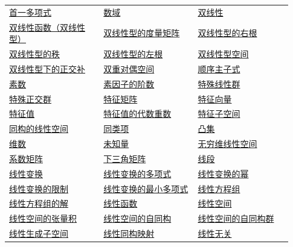 \begin{longtable}{@{}>{\raggedright\arraybackslash}p{0.31\linewidth}>{\raggedright\arraybackslash}p{0.31\linewidth}>{\raggedright\arraybackslash}p{0.31\linewidth}@{}}
\hyperref[p1:concept:c1-l558]{首一多项式} & \hyperref[p1:concept:c1-l518]{数域} & \hyperref[p1:concept:c6-l6]{双线性}\\
\hyperref[p1:concept:c7-l335]{双线性函数（双线性型）} & \hyperref[p1:concept:c7-l411]{双线性型的度量矩阵} & \hyperref[p1:concept:c7-l392]{双线性型的右根}\\
\hyperref[p1:concept:c7-l485]{双线性型的秩} & \hyperref[p1:concept:c7-l392]{双线性型的左根} & \hyperref[p1:concept:c7-l335]{双线性型空间}\\
\hyperref[p1:concept:c7-l2876]{双线性型下的正交补} & \hyperref[p1:concept:c7-l250]{双重对偶空间} & \hyperref[p1:concept:c7-l1848]{顺序主子式}\\
\hyperref[p1:concept:c1-l98]{素数} & \hyperref[p1:concept:c1-l498]{素因子的阶数} & \hyperref[p1:concept:c3-l2291]{特殊线性群}\\
\hyperref[p1:concept:c6-l1156]{特殊正交群} & \hyperref[p1:concept:c5-l1709]{特征矩阵} & \hyperref[p1:concept:c5-l171]{特征向量}\\
\hyperref[p1:concept:c5-l171]{特征值} & \hyperref[p1:concept:c5-l495]{特征值的代数重数} & \hyperref[p1:concept:c5-l171]{特征子空间}\\
\hyperref[p1:concept:c4-l2065]{同构的线性空间} & \hyperref[p1:concept:c1-l1278]{同类项} & \hyperref[p1:concept:c4-l3141]{凸集}\\
\hyperref[p1:concept:c4-l375]{维数} & \hyperref[p1:concept:c2-l7]{未知量} & \hyperref[p1:concept:c4-l375]{无穷维线性空间}\\
\hyperref[p1:concept:c2-l705]{系数矩阵} & \hyperref[p1:concept:c3-l881]{下三角矩阵} & \hyperref[p1:concept:c4-l3135]{线段}\\
\hyperref[p1:concept:c4-l1349]{线性变换} & \hyperref[p1:concept:c3-l363]{线性变换的多项式} & \hyperref[p1:concept:c3-l363]{线性变换的幂}\\
\hyperref[p1:concept:c5-l8]{线性变换的限制} & \hyperref[p1:concept:c4-l2846]{线性变换的最小多项式} & \hyperref[p1:concept:c2-l7]{线性方程组}\\
\hyperref[p1:concept:c2-l7]{线性方程组的解} & \hyperref[p1:concept:c7-l12]{线性函数} & \hyperref[p1:concept:c4-l7]{线性空间}\\
\hyperref[p1:concept:c7-l2637]{线性空间的张量积} & \hyperref[p1:concept:c4-l1981]{线性空间的自同构} & \hyperref[p1:concept:c4-l1981]{线性空间的自同构群}\\
\hyperref[p1:concept:c4-l722]{线性生成子空间} & \hyperref[p1:concept:c4-l1940]{线性同构映射} & \hyperref[p1:concept:c2-l270]{线性无关}\\

\end{longtable}
